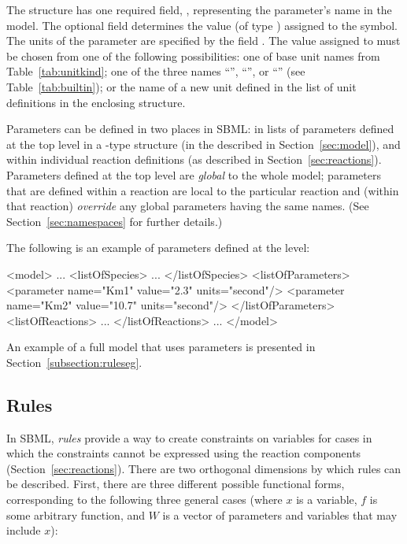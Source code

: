 \documentclass[10pt]{cekarticle}
\newcommand{\vref}[1]{\ref{#1}}
\newcommand{\changed}[1]{\textcolor{BrickRed}{#1}}
\begin{document}
\changed{The  structure has one required field,
  \attrib{name}, representing the parameter's name in the model.}  The
\changed{optional} field  determines the value (of type
) assigned to the symbol.  The units of the parameter
 are specified by the field .  The value
assigned to  must be chosen from one of the following
possibilities: one of base unit names from Table~\vref{tab:unitkind}; one
of the three names ``'', ``'', or
``'' (see Table~\ref{tab:builtin}); or the name of a new
unit defined in the list of unit definitions in the enclosing 
structure.

Parameters \changed{can be defined} in two places in SBML: in lists of
parameters defined at the top level in a -type structure
\changed{(in the  described in
  Section~\ref{sec:model})}, and within individual reaction definitions
\changed{(as described in Section~\ref{sec:reactions})}.  Parameters
defined at the top level are \emph{global} to the whole model; parameters
that are defined within a reaction are local to the particular reaction and
(within that reaction) \emph{override} any global parameters having the
same names.  (See Section~\ref{sec:namespaces} for further details.)

The following is an example of parameters defined at the  level:

\begin{example}
<model>
    ...
    <listOfSpecies>
        ...
    </listOfSpecies>
    <listOfParameters>
        <parameter name="Km1" value="2.3" units="second"/>
        <parameter name="Km2" value="10.7" units="second"/>
    </listOfParameters>
    <listOfReactions>
        ...
    </listOfReactions>
    ...
</model>
\end{example}

An example of a full model that uses parameters is presented in
Section~\ref{subsection:ruleseg}.


\subsection{Rules}
\label{sec:rules}

In SBML, \emph{rules} provide a way to create constraints on variables for
cases in which the constraints cannot be expressed using the reaction
components (Section~\ref{sec:reactions}).  There are two orthogonal
dimensions by which rules can be described.  First, there are three
different possible functional forms, corresponding to the following three
general cases \changed{(where $x$ is a variable, $f$ is some
arbitrary function, and $W$ is a vector of parameters and variables that
may include $x$):}
\end{document}
